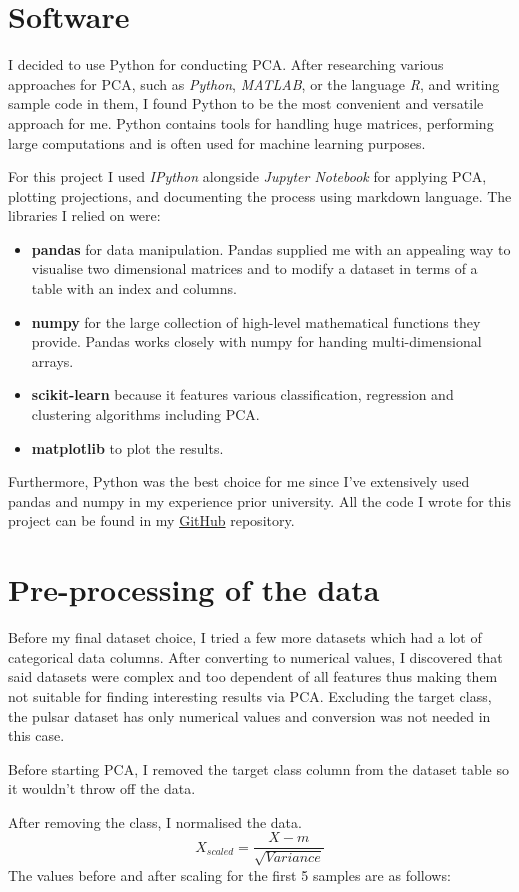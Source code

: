\documentclass[a4paper,12pt]{article}
\begin{document}
    \section{Software}
    I decided to use Python for conducting PCA. After researching various approaches for PCA, such as \textit{Python}, \textit{MATLAB}, or the language \textit{R}, and writing sample code in them, I found Python to be the most convenient and versatile approach for me. Python contains tools for handling huge matrices, performing large computations and is often used for machine learning purposes.\par
    For this project I used \textit{IPython} alongside \textit{Jupyter Notebook} for applying PCA, plotting projections, and documenting the process using markdown language. The libraries I relied on were:
    \begin{itemize}
        \item \textbf{pandas} for data manipulation. Pandas supplied me with an appealing way to visualise two dimensional matrices and to modify a dataset in terms of a table with an index and columns.
        \item \textbf{numpy} for the large collection of high-level mathematical functions they provide. Pandas works closely with numpy for handing multi-dimensional arrays.
        \item \textbf{scikit-learn} because it features various classification, regression and clustering algorithms including PCA.
        \item \textbf{matplotlib} to plot the results.
    \end{itemize}
    Furthermore, Python was the best choice for me since I've extensively used pandas and numpy in my experience prior university. All the code I wrote for this project can be found in my \href{https://github.com/MarchiT/pulsar-pca}{GitHub} repository.
    \newpage

    \section{Pre-processing of the data}
    Before my final dataset choice, I tried a few more datasets which had a lot of categorical data columns. After converting to numerical values, I discovered that said datasets were complex and too dependent of all features thus making them not suitable for finding interesting results via PCA. Excluding the target class, the pulsar dataset has only numerical values and conversion was not needed in this case.\par
    Before starting PCA, I removed the target class column from the dataset table so it wouldn't throw off the data.\par
    After removing the class, I normalised the data.
    \[X_{scaled} = \frac{X - m}{\sqrt{Variance}}\]
    The values before and after scaling for the first 5 samples are as follows:
\end{document}
